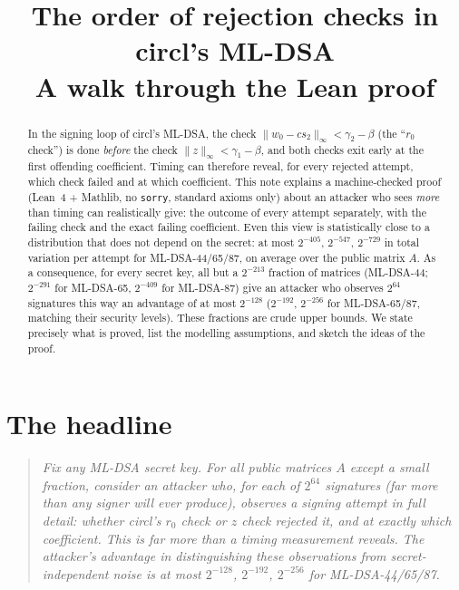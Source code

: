 \documentclass[11pt]{article}
\title{The order of rejection checks in circl's ML-DSA\\
\large A walk through the Lean proof \lean{RejOrder.lean}}
\author{}\date{}
\theoremstyle{definition}
\theoremstyle{remark}
\newcommand{\lean}[1]{\texttt{#1}}
\begin{document}
\maketitle

\begin{center}
\end{center}

\begin{abstract}
In the signing loop of circl's ML-DSA, the check $\|w_0 - c s_2\|_\infty < \gamma_2-\beta$
(the ``$r_0$ check'') is done \emph{before} the check $\|z\|_\infty < \gamma_1 - \beta$, and both
checks exit early at the first offending coefficient. Timing can therefore reveal, for every
rejected attempt, which check failed and at which coefficient. This note explains a machine-checked
proof (Lean~4 + Mathlib, no \lean{sorry}, standard axioms only) about an attacker who sees
\emph{more} than timing can realistically give: the outcome of every attempt separately, with the
failing check and the exact failing coefficient. Even this view is statistically close to a
distribution that does not depend on the secret: at most $2^{-405}$, $2^{-547}$, $2^{-729}$ in
total variation per attempt for ML-DSA-44/65/87, on average over the public matrix $A$. As a
consequence, for every secret key, all but a $2^{-213}$ fraction of matrices
(ML-DSA-44; $2^{-291}$ for ML-DSA-65, $2^{-409}$ for ML-DSA-87) give an attacker who observes
$2^{64}$ signatures this way an advantage of at most $2^{-128}$ ($2^{-192}$, $2^{-256}$ for
ML-DSA-65/87, matching their security levels). These fractions are crude upper bounds.
We state precisely what is proved, list the modelling assumptions, and sketch the ideas of the
proof.
\end{abstract}

\tableofcontents

\section{The headline}\label{sec:headline}

\begin{quote}
\emph{Fix any ML-DSA secret key. For all public matrices $A$ except a small fraction, consider
an attacker who, for each of $2^{64}$ signatures (far more than any signer will ever
produce), observes a signing attempt in full detail: whether circl's $r_0$ check or $z$ check rejected it, and at
exactly which coefficient. This is far more than a timing measurement reveals. The attacker's
advantage in distinguishing these observations from secret-independent noise is at most
$2^{-128}$, $2^{-192}$, $2^{-256}$ for ML-DSA-44/65/87.}
\end{quote}
\end{document}
